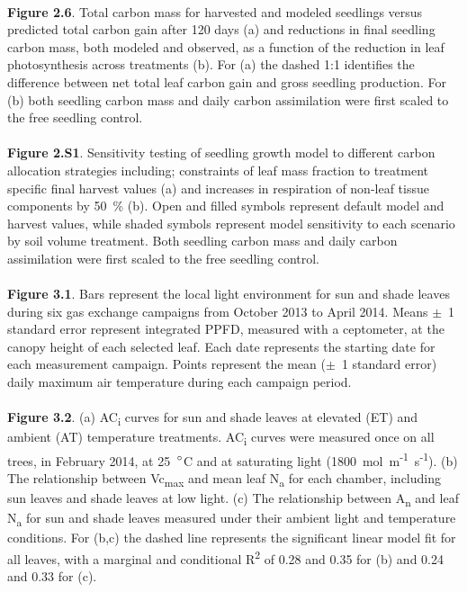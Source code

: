 \documentclass[a4paper]{article}\usepackage[]{graphicx}\usepackage[]{color}
\begin{document}
\\
\textbf{Figure 2.6}. Total carbon mass for harvested and modeled seedlings versus predicted total carbon gain after 120 days (a) and  reductions in final seedling carbon mass, both modeled and observed, as a function of the reduction in leaf photosynthesis across treatments (b). For (a) the dashed 1:1 identifies the difference between net total leaf carbon gain and gross seedling production. For (b) both seedling carbon mass and daily carbon assimilation were first scaled to the free seedling control.
\\
\\
\textbf{Figure 2.S1}. Sensitivity testing of seedling growth model to different carbon allocation strategies including; constraints of leaf mass fraction to treatment specific final harvest values (a) and increases in respiration of non-leaf tissue components by 50~\% (b). Open and filled symbols represent default model and harvest values, while shaded symbols represent model sensitivity to each scenario by soil volume treatment. Both seedling carbon mass and daily carbon assimilation were first scaled to the free seedling control.
\\
\\
\textbf{Figure 3.1}. Bars represent the local light environment for sun and shade leaves during six gas exchange campaigns from October 2013 to April 2014. Means $\pm$~1 standard error represent integrated PPFD, measured with a ceptometer, at the canopy height of each selected leaf. Each date represents the starting date for each measurement campaign. Points represent the mean ($\pm$~1 standard error) daily maximum air temperature during each campaign period.
\\
\\
\textbf{Figure 3.2}. (a) AC\textsubscript{i} curves for sun and shade leaves at elevated (ET) and ambient (AT) temperature treatments. AC\textsubscript{i} curves were measured once on all trees, in February 2014, at 25~$\degree$C and at saturating light (1800~{\textmugreek}mol~m\textsuperscript{-1}~s\textsuperscript{-1}). (b) The relationship between Vc\textsubscript{max} and mean leaf N\textsubscript{a} for each chamber, including sun leaves and shade leaves at low light. (c) The relationship between A\textsubscript{n} and leaf N\textsubscript{a} for sun and shade leaves measured under their ambient light and temperature conditions. For (b,c) the dashed line represents the significant linear model fit for all leaves, with a marginal and conditional R\textsuperscript{2} of 0.28 and 0.35 for (b) and 0.24 and 0.33 for (c).
\end{document}
